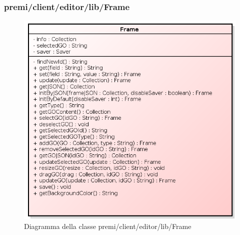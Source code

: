 \subsubsection{premi/client/editor/lib/Frame}
\begin{figure}[h]
\begin{center}
\includegraphics[scale=0.40]{img/diacla/frame.png}
\caption{Diagramma della classe premi/client/editor/lib/Frame}
\end{center}
\end{figure}

